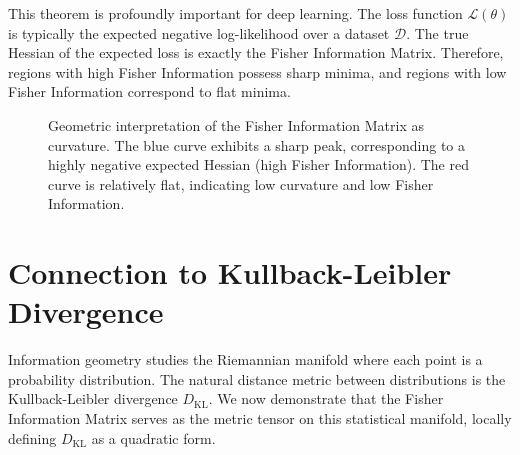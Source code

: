 This theorem is profoundly important for deep learning. The loss function $\mathcal{L}(\theta)$ is typically the expected negative log-likelihood over a dataset $\mathcal{D}$. The true Hessian of the expected loss is exactly the Fisher Information Matrix. Therefore, regions with high Fisher Information possess sharp minima, and regions with low Fisher Information correspond to flat minima.

\begin{figure}[htbp]
\centering
{}
\caption{Geometric interpretation of the Fisher Information Matrix as curvature. The blue curve exhibits a sharp peak, corresponding to a highly negative expected Hessian (high Fisher Information). The red curve is relatively flat, indicating low curvature and low Fisher Information.}
\label{fig:fisher_curvature}
\end{figure}

\section{Connection to Kullback-Leibler Divergence}

Information geometry studies the Riemannian manifold where each point is a probability distribution. The natural distance metric between distributions is the Kullback-Leibler divergence $D_{\text{KL}}$. We now demonstrate that the Fisher Information Matrix serves as the metric tensor on this statistical manifold, locally defining $D_{\text{KL}}$ as a quadratic form.

